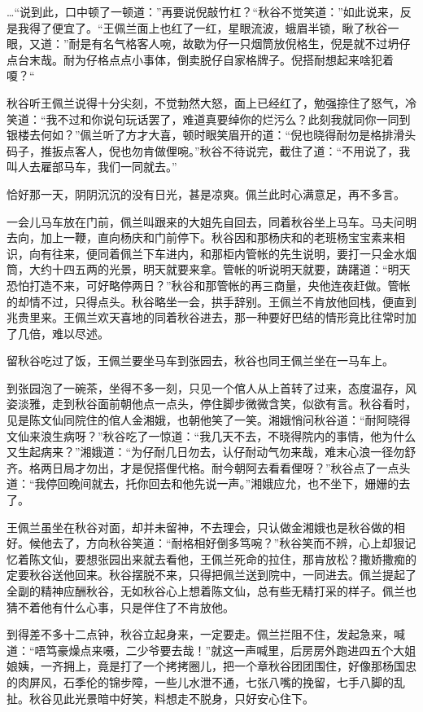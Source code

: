 \documentclass[12pt,UTF8]{ctexbook}
\begin{document}
{{{…“说到此，口中顿了一顿道：”再要说倪敲竹杠？“秋谷不觉笑道：”如此说来，反是我得了便宜了。“王佩兰面上也红了一红，星眼流波，蛾眉半锁，瞅了秋谷一眼，又道：”耐是有名气格客人啘，故歇为仔一只烟筒放倪格生，倪是就不过坍仔点台末哉。耐为仔格点点小事体，倒卖脱仔自家格牌子。倪搭耐想起来啥犯着嗄？“

秋谷听王佩兰说得十分尖刻，不觉勃然大怒，面上已经红了，勉强捺住了怒气，冷笑道：“我不过和你说句玩话罢了，难道真要绰你的烂污么？此刻我就同你一同到银楼去何如？”佩兰听了方才大喜，顿时眼笑眉开的道：“倪也晓得耐勿是格排滑头码子，推扳点客人，倪也勿肯做俚啘。”秋谷不待说完，截住了道：“不用说了，我叫人去雇部马车，我们一同就去。”

恰好那一天，阴阴沉沉的没有日光，甚是凉爽。佩兰此时心满意足，再不多言。

一会儿马车放在门前，佩兰叫跟来的大姐先自回去，同着秋谷坐上马车。马夫问明去向，加上一鞭，直向杨庆和门前停下。秋谷因和那杨庆和的老班杨宝宝素来相识，向有往来，便同着佩兰下车进内，和那柜内管帐的先生说明，要打一只金水烟筒，大约十四五两的光景，明天就要来拿。管帐的听说明天就要，踌躇道：“明天恐怕打造不来，可好略停两日？”秋谷和那管帐的再三商量，央他连夜赶做。管帐的却情不过，只得点头。秋谷略坐一会，拱手辞别。王佩兰不肯放他回栈，便直到兆贵里来。王佩兰欢天喜地的同着秋谷进去，那一种要好巴结的情形竟比往常时加了几倍，难以尽述。

留秋谷吃过了饭，王佩兰要坐马车到张园去，秋谷也同王佩兰坐在一马车上。

到张园泡了一碗茶，坐得不多一刻，只见一个倌人从上首转了过来，态度温存，风姿淡雅，走到秋谷面前朝他点一点头，停住脚步微微含笑，似欲有言。秋谷看时，见是陈文仙同院住的倌人金湘娥，也朝他笑了一笑。湘娥悄问秋谷道：“耐阿晓得文仙来浪生病呀？”秋谷吃了一惊道：“我几天不去，不晓得院内的事情，他为什么又生起病来？”湘娥道：“为仔耐几日勿去，认仔耐动气勿来哉，难末心浪一径勿舒齐。格两日局才勿出，才是倪搭俚代格。耐今朝阿去看看俚呀？”秋谷点了一点头道：“我停回晚间就去，托你回去和他先说一声。”湘娥应允，也不坐下，姗姗的去了。

王佩兰虽坐在秋谷对面，却并未留神，不去理会，只认做金湘娥也是秋谷做的相好。候他去了，方向秋谷笑道：“耐格相好倒多笃啘？”秋谷笑而不辨，心上却狠记忆着陈文仙，要想张园出来就去看他，王佩兰死命的拉住，那肯放松？撒娇撒痴的定要秋谷送他回来。秋谷摆脱不来，只得把佩兰送到院中，一同进去。佩兰提起了全副的精神应酬秋谷，无如秋谷心上想着陈文仙，总有些无精打采的样子。佩兰也猜不着他有什么心事，只是伴住了不肯放他。

到得差不多十二点钟，秋谷立起身来，一定要走。佩兰拦阻不住，发起急来，喊道：“唔笃豪燥点来嗫，二少爷要去哉！”就这一声喊里，后房房外跑进四五个大姐娘姨，一齐拥上，竟是打了一个拷拷圈儿，把一个章秋谷团团围住，好像那杨国忠的肉屏风，石季伦的锦步障，一些儿水泄不通，七张八嘴的挽留，七手八脚的乱扯。秋谷见此光景暗中好笑，料想走不脱身，只好安心住下。

}}}
\end{document}
